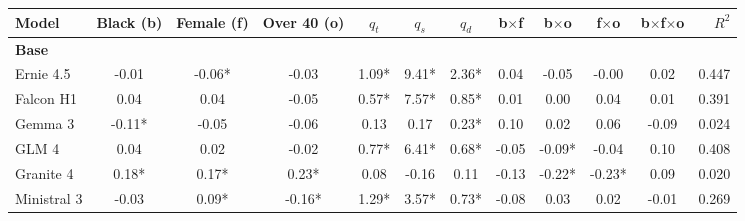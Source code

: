 \begin{table}[p]
\centering
\scriptsize
\setlength{\tabcolsep}{5pt}
\renewcommand{\arraystretch}{1.18}
\begin{tabular}{lccccccccccr}
\toprule
Model & Black (b) & Female (f) & Over 40 (o) & $q_t$ & $q_s$ & $q_d$ & b$\times$f & b$\times$o & f$\times$o & b$\times$f$\times$o & $R^2$ \\
\midrule
\multicolumn{12}{l}{\textbf{Base}} \\
Ernie 4.5 & \cellcolor[HTML]{FEFAF9}-0.01 & \cellcolor[HTML]{FADCD9}-0.06* & \cellcolor[HTML]{FCE8E6}-0.03 & \cellcolor[HTML]{87DAAE}1.09* & \cellcolor[HTML]{74D4A2}9.41* & \cellcolor[HTML]{2EBE73}2.36* & \cellcolor[HTML]{BCEAD2}0.04 & \cellcolor[HTML]{F9D5D1}-0.05 & \cellcolor[HTML]{FFFDFD}-0.00 & \cellcolor[HTML]{D3F1E1}0.02 & 0.447 \\
Falcon H1 & \cellcolor[HTML]{DBF4E7}0.04 & \cellcolor[HTML]{E4F7ED}0.04 & \cellcolor[HTML]{FAD9D6}-0.05 & \cellcolor[HTML]{C0ECD5}0.57* & \cellcolor[HTML]{90DCB4}7.57* & \cellcolor[HTML]{B4E8CC}0.85* & \cellcolor[HTML]{F6FCF9}0.01 & \cellcolor[HTML]{FEFFFE}0.00 & \cellcolor[HTML]{DDF5E8}0.04 & \cellcolor[HTML]{E3F6ED}0.01 & 0.391 \\
Gemma 3 & \cellcolor[HTML]{F4B0A9}-0.11* & \cellcolor[HTML]{FBE1DE}-0.05 & \cellcolor[HTML]{F9D0CC}-0.06 & \cellcolor[HTML]{F1FBF6}0.13 & \cellcolor[HTML]{FDFEFD}0.17 & \cellcolor[HTML]{EAF9F1}0.23* & \cellcolor[HTML]{61CE95}0.10 & \cellcolor[HTML]{EFFAF5}0.02 & \cellcolor[HTML]{CCEFDD}0.06 & \cellcolor[HTML]{EB6B5E}-0.09 & 0.024 \\
GLM 4 & \cellcolor[HTML]{E1F6EB}0.04 & \cellcolor[HTML]{F1FBF5}0.02 & \cellcolor[HTML]{FDEDEB}-0.02 & \cellcolor[HTML]{AAE5C6}0.77* & \cellcolor[HTML]{A1E2C0}6.41* & \cellcolor[HTML]{C2ECD6}0.68* & \cellcolor[HTML]{F6BDB7}-0.05 & \cellcolor[HTML]{F5B8B1}-0.09* & \cellcolor[HTML]{FBE2DF}-0.04 & \cellcolor[HTML]{2EBE73}0.10 & 0.408 \\
Granite 4 & \cellcolor[HTML]{69D09B}0.18* & \cellcolor[HTML]{87DAAE}0.17* & \cellcolor[HTML]{3AC27B}0.23* & \cellcolor[HTML]{F6FCF9}0.08 & \cellcolor[HTML]{FFFDFD}-0.16 & \cellcolor[HTML]{F5FCF8}0.11 & \cellcolor[HTML]{E74C3C}-0.13 & \cellcolor[HTML]{E74C3C}-0.22* & \cellcolor[HTML]{E74C3C}-0.23* & \cellcolor[HTML]{41C480}0.09 & 0.020 \\
Ministral 3 & \cellcolor[HTML]{FCE8E6}-0.03 & \cellcolor[HTML]{BEEBD3}0.09* & \cellcolor[HTML]{EF867B}-0.16* & \cellcolor[HTML]{70D39F}1.29* & \cellcolor[HTML]{CAEFDC}3.57* & \cellcolor[HTML]{BEEBD4}0.73* & \cellcolor[HTML]{F08E84}-0.08 & \cellcolor[HTML]{E7F8EF}0.03 & \cellcolor[HTML]{F0FAF5}0.02 & \cellcolor[HTML]{FCE6E4}-0.01 & 0.269 \\

\end{tabular}
\end{table}
